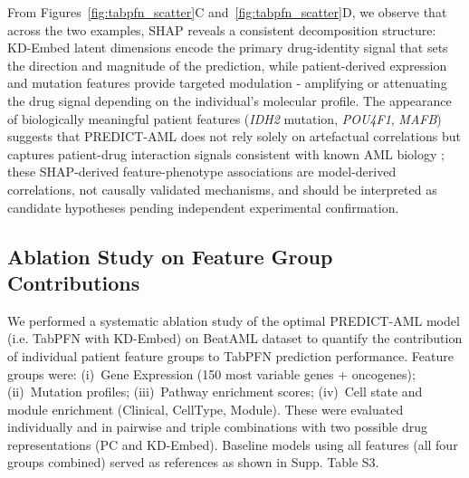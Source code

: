 \documentclass[pdflatex,sn-mathphys-num]{sn-jnl}
\theoremstyle{thmstyleone}
\theoremstyle{thmstyletwo}
\theoremstyle{thmstylethree}
\begin{document}

From Figures~\ref{fig:tabpfn_scatter}C and~\ref{fig:tabpfn_scatter}D, we observe that across the two examples, SHAP reveals a consistent decomposition structure: KD-Embed latent dimensions encode the primary drug-identity signal that sets the direction and magnitude of the prediction, while patient-derived expression and mutation features provide targeted modulation - amplifying or attenuating the drug signal depending on the individual's molecular profile. The appearance of biologically meaningful patient features (\textit{IDH2} mutation, \textit{POU4F1}, \textit{MAFB}) suggests that PREDICT-AML does not rely solely on artefactual correlations but captures patient-drug interaction signals consistent with known AML biology \cite{bisaillon2020genetic, diamantidis2025factors, ventura2025mafb}; these SHAP-derived feature-phenotype associations are model-derived correlations, not causally validated mechanisms, and should be interpreted as candidate hypotheses pending independent experimental confirmation.
\subsection{Ablation Study on Feature Group Contributions}\label{sec3.4}
We performed a systematic ablation study of the optimal PREDICT-AML model (i.e. TabPFN with KD-Embed) on BeatAML dataset to quantify the contribution of individual patient feature groups to TabPFN prediction performance. Feature groups were: (i)~Gene Expression (150 most variable genes + oncogenes); (ii)~Mutation profiles; (iii)~Pathway enrichment scores; (iv)~Cell state and module enrichment (Clinical, CellType, Module). These were evaluated individually and in pairwise and triple combinations with two possible drug representations (PC and KD-Embed). Baseline models using all features (all four groups combined) served as references as shown in Supp. Table S3.
\end{document}

